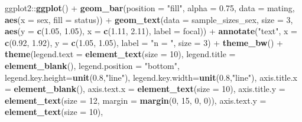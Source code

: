 \documentclass[]{article}
\newenvironment{Shaded}{\begin{snugshade}}{\end{snugshade}}
\newcommand{\KeywordTok}[1]{\textcolor[rgb]{0.13,0.29,0.53}{\textbf{{#1}}}}
\newcommand{\DataTypeTok}[1]{\textcolor[rgb]{0.13,0.29,0.53}{{#1}}}
\newcommand{\DecValTok}[1]{\textcolor[rgb]{0.00,0.00,0.81}{{#1}}}
\newcommand{\FloatTok}[1]{\textcolor[rgb]{0.00,0.00,0.81}{{#1}}}
\newcommand{\StringTok}[1]{\textcolor[rgb]{0.31,0.60,0.02}{{#1}}}
\newcommand{\NormalTok}[1]{{#1}}
\begin{document}
\begin{Shaded}
\begin{Highlighting}[]
\NormalTok{ggplot2::}\KeywordTok{ggplot}\NormalTok{() +}
\StringTok{          }\KeywordTok{geom_bar}\NormalTok{(}\DataTypeTok{position =} \StringTok{"fill"}\NormalTok{, }\DataTypeTok{alpha =} \FloatTok{0.75}\NormalTok{, }
                   \DataTypeTok{data =} \NormalTok{mating, }\KeywordTok{aes}\NormalTok{(}\DataTypeTok{x =} \NormalTok{sex, }\DataTypeTok{fill =} \NormalTok{status)) +}
\StringTok{          }\KeywordTok{geom_text}\NormalTok{(}\DataTypeTok{data =} \NormalTok{sample_sizes_sex, }\DataTypeTok{size =} \DecValTok{3}\NormalTok{, }
                    \KeywordTok{aes}\NormalTok{(}\DataTypeTok{y =} \KeywordTok{c}\NormalTok{(}\FloatTok{1.05}\NormalTok{, }\FloatTok{1.05}\NormalTok{), }\DataTypeTok{x =} \KeywordTok{c}\NormalTok{(}\FloatTok{1.11}\NormalTok{, }\FloatTok{2.11}\NormalTok{), }\DataTypeTok{label =} \NormalTok{focal)) +}
\StringTok{          }\KeywordTok{annotate}\NormalTok{(}\StringTok{"text"}\NormalTok{, }\DataTypeTok{x =} \KeywordTok{c}\NormalTok{(}\FloatTok{0.92}\NormalTok{, }\FloatTok{1.92}\NormalTok{), }\DataTypeTok{y =} \KeywordTok{c}\NormalTok{(}\FloatTok{1.05}\NormalTok{, }\FloatTok{1.05}\NormalTok{), }
                   \DataTypeTok{label =} \StringTok{"n = "}\NormalTok{, }\DataTypeTok{size =} \DecValTok{3}\NormalTok{) +}
\StringTok{          }\KeywordTok{theme_bw}\NormalTok{() +}
\StringTok{          }\KeywordTok{theme}\NormalTok{(}\DataTypeTok{legend.text =} \KeywordTok{element_text}\NormalTok{(}\DataTypeTok{size =} \DecValTok{10}\NormalTok{),}
                \DataTypeTok{legend.title =} \KeywordTok{element_blank}\NormalTok{(),}
                \DataTypeTok{legend.position =} \StringTok{"bottom"}\NormalTok{,}
                \DataTypeTok{legend.key.height=}\KeywordTok{unit}\NormalTok{(}\FloatTok{0.8}\NormalTok{,}\StringTok{"line"}\NormalTok{),}
                \DataTypeTok{legend.key.width=}\KeywordTok{unit}\NormalTok{(}\FloatTok{0.8}\NormalTok{,}\StringTok{"line"}\NormalTok{),}
                \DataTypeTok{axis.title.x =} \KeywordTok{element_blank}\NormalTok{(),}
                \DataTypeTok{axis.text.x  =} \KeywordTok{element_text}\NormalTok{(}\DataTypeTok{size =} \DecValTok{10}\NormalTok{), }
                \DataTypeTok{axis.title.y =} \KeywordTok{element_text}\NormalTok{(}\DataTypeTok{size =} \DecValTok{12}\NormalTok{, }\DataTypeTok{margin =} \KeywordTok{margin}\NormalTok{(}\DecValTok{0}\NormalTok{, }\DecValTok{15}\NormalTok{, }\DecValTok{0}\NormalTok{, }\DecValTok{0}\NormalTok{)),}
                \DataTypeTok{axis.text.y =} \KeywordTok{element_text}\NormalTok{(}\DataTypeTok{size =} \DecValTok{10}\NormalTok{), }

\end{Highlighting}
\end{Shaded}
\end{document}
